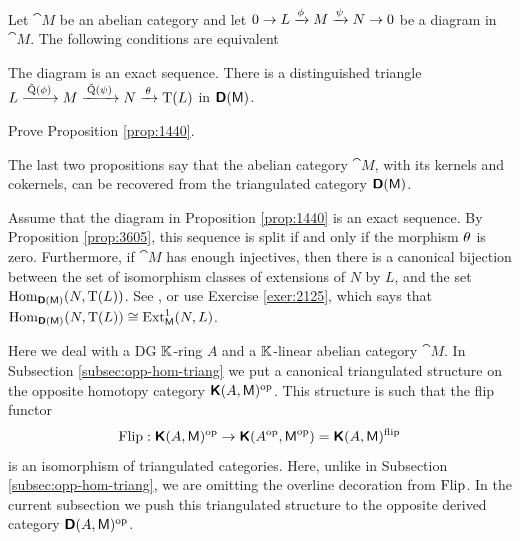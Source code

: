 \begin{prop} \label{prop:1440}
Let $\cat{M}$ be an abelian category and let 
$0 \to L \xrightarrow{\phi}  M \xrightarrow{\psi} N \to 0$ 
be a diagram in $\cat{M}$. The following conditions are equivalent\tup{:}
\begin{enumerate}
 The diagram is an exact sequence. 
  There is a distinguished triangle 
$L \xrightarrow{ \, \tilde{\operatorname{Q}}(\phi) \, }  M \xrightarrow{ \, \tilde{\operatorname{Q}}(\psi) \, } N 
\xrightarrow{ \, \theta \, } \operatorname{T}(L)$ 
in $\boldsymbol{\mathsf{D}}(\operatorname{\mathsf{M}})$.
\end{enumerate}
\end{prop}

\begin{exer} \label{exer:1917}
Prove Proposition \ref{prop:1440}. 
\end{exer}

The last two propositions say that the abelian category $\cat{M}$, with its 
kernels and cokernels, can be recovered from the triangulated category 
$\boldsymbol{\mathsf{D}}(\operatorname{\mathsf{M}})$. 

\begin{rem} \label{rem:2320}
Assume that the diagram in Proposition \ref{prop:1440} is an exact sequence.
By Proposition \ref{prop:3605}, this sequence is split if and only if the 
morphism $\theta$ is zero. Furthermore, if $\cat{M}$ has enough injectives, then 
there is a canonical bijection between the set of 
isomorphism classes of extensions of $N$ by $L$, and the set 
$\operatorname{Hom}_{\boldsymbol{\mathsf{D}}(\operatorname{\mathsf{M}})}(N, \operatorname{T}(L))$. See \cite[Section I.6]{RD}, or 
use Exercise \ref{exer:2125}, which says that 
$\operatorname{Hom}_{\boldsymbol{\mathsf{D}}(\operatorname{\mathsf{M}})}(N, \operatorname{T}(L)) \cong 
\operatorname{Ext}^1_{\operatorname{\mathsf{M}}}(N, L)$.
\end{rem}



\label{subsec:opp-dercat-triang}

Here we deal with a DG $\mathbb{K}$-ring $A$ and a $\mathbb{K}$-linear 
abelian category $\cat{M}$. 
In Subsection \ref{subsec:opp-hom-triang} we put a canonical triangulated 
structure on the opposite homotopy category 
$\boldsymbol{\mathsf{K}}(A, \operatorname{\mathsf{M}})^{\mathrm{op}}$. This structure is such that the flip functor 
\[ \operatorname{Flip} : \boldsymbol{\mathsf{K}}(A, \operatorname{\mathsf{M}})^{\mathrm{op}} \to
\boldsymbol{\mathsf{K}}(A^{\mathrm{op}}, \operatorname{\mathsf{M}}^{\mathrm{op}}) =  
\boldsymbol{\mathsf{K}}(A, \operatorname{\mathsf{M}})^{\mathrm{flip}} \]
is an isomorphism of triangulated categories. 
Here, unlike in Subsection \ref{subsec:opp-hom-triang},
we are omitting the overline decoration from $\operatorname{Flip}$. 
In the current subsection we push this triangulated structure to 
the opposite derived category $\boldsymbol{\mathsf{D}}(A, \operatorname{\mathsf{M}})^{\mathrm{op}}$.

